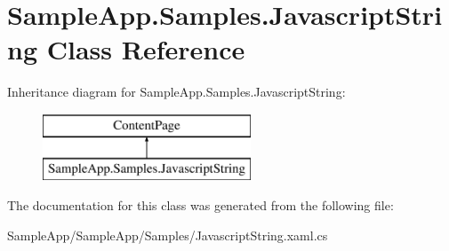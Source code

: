 \hypertarget{class_sample_app_1_1_samples_1_1_javascript_string}{}\section{Sample\+App.\+Samples.\+Javascript\+String Class Reference}
\label{class_sample_app_1_1_samples_1_1_javascript_string}
Inheritance diagram for Sample\+App.\+Samples.\+Javascript\+String\+:\begin{figure}[H]
\begin{center}
\leavevmode
\includegraphics[height=2.000000cm]{class_sample_app_1_1_samples_1_1_javascript_string}
\end{center}
\end{figure}


The documentation for this class was generated from the following file\+:\begin{DoxyCompactItemize}
\item 
Sample\+App/\+Sample\+App/\+Samples/Javascript\+String.\+xaml.\+cs\end{DoxyCompactItemize}
